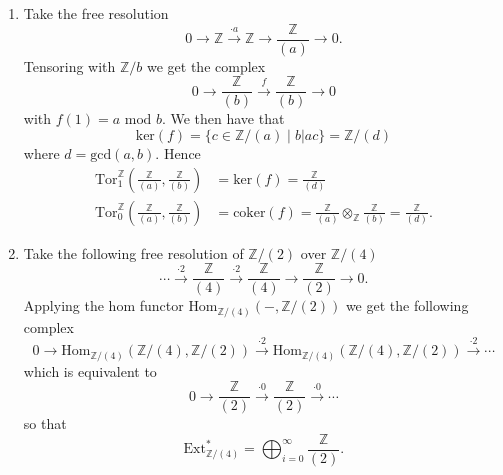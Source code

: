 \documentclass[a4paper]{article}
\begin{document}
\begin{exercise}{2}
\begin{enumerate}[label=(\roman*)]
    \item Take the free resolution
      \begin{equation*}
        0 \to \mathbb{Z} \xrightarrow{\cdot a} \mathbb{Z} \to \frac{\mathbb{Z}}{(a)} \to 0
      .\end{equation*}
      Tensoring with $ \mathbb{Z}/b $ we get the complex
      \begin{equation*}
        0 \to \frac{\mathbb{Z}}{(b)} \xrightarrow{f} \frac{\mathbb{Z}}{(b)} \to 0
      \end{equation*}
      with $ f(1) = a \text{ mod } b $. We then have that
      \begin{equation*}
        \text{ker}(f) = \{c \in \mathbb{Z}/(a) \mid b | ac\} = \mathbb{Z}/(d)
      \end{equation*}
      where $ d = \text{gcd}(a,b) $. Hence
      \begin{align*}
        \text{Tor}_1^{\mathbb{Z}} \left( \frac{\mathbb{Z}}{(a)}, \frac{\mathbb{Z}}{(b)} \right) &= \text{ker}(f) = \frac{\mathbb{Z}}{(d)} \\
        \text{Tor}_0^{\mathbb{Z}} \left( \frac{\mathbb{Z}}{(a)}, \frac{\mathbb{Z}}{(b)} \right) &= \text{coker}(f) = \frac{\mathbb{Z}}{(a)} \otimes_{\mathbb{Z}} \frac{\mathbb{Z}}{(b)} = \frac{\mathbb{Z}}{(d)}
      .\end{align*}

    \item Take the following free resolution of $ \mathbb{Z}/(2) $ over $ \mathbb{Z}/(4) $
      \begin{equation*}
        \cdots \xrightarrow{\cdot 2} \frac{\mathbb{Z}}{(4)} \xrightarrow{\cdot 2} \frac{\mathbb{Z}}{(4)} \to \frac{\mathbb{Z}}{(2)} \to 0
      .\end{equation*}
      Applying the hom functor $ \text{Hom}_{\mathbb{Z}/(4)}(-, \mathbb{Z}/(2)) $ we get the following complex
      \begin{equation*}
        0 \to \text{Hom}_{\mathbb{Z}/(4)}(\mathbb{Z}/(4), \mathbb{Z}/(2)) \xrightarrow{\cdot 2} \text{Hom}_{\mathbb{Z}/(4)}(\mathbb{Z}/(4), \mathbb{Z}/(2)) \xrightarrow{\cdot 2} \cdots
      \end{equation*}
      which is equivalent to
      \begin{equation*}
        0 \to \frac{\mathbb{Z}}{(2)} \xrightarrow{\cdot 0} \frac{\mathbb{Z}}{(2)} \xrightarrow{\cdot 0} \cdots
      \end{equation*}
      so that
      \begin{equation*}
        \text{Ext}_{\mathbb{Z}/(4)}^{*} = \bigoplus_{i = 0}^{\infty} \frac{\mathbb{Z}}{(2)}
      .\end{equation*}


\end{enumerate}
\end{exercise}
\end{document}
